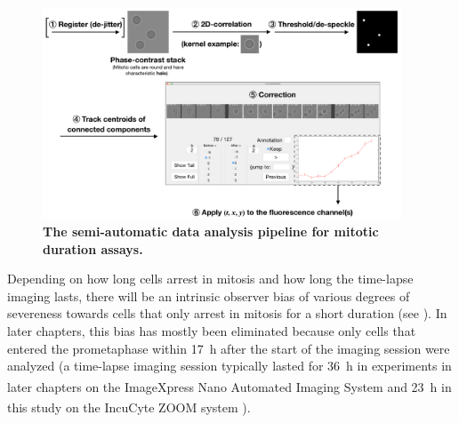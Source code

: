 \begin{figure}
    \centering
    \includegraphics[width=0.95\textwidth]{chapters/figures/DataAnalysisPipeline.pdf}
    \caption{\textbf{The semi-automatic data analysis pipeline for mitotic duration assays.}}
    \label{DataAnalysisPipeline}
\end{figure}

Depending on how long cells arrest in mitosis and how long the time-lapse imaging lasts, there will be an intrinsic observer bias of various degrees of severeness towards cells that only arrest in mitosis for a short duration (see ). In later chapters, this bias has mostly been eliminated because only cells that entered the prometaphase within \SI{17}{h} after the start of the imaging session were analyzed (a time-lapse imaging session typically lasted for \SI{36}{h} in experiments in later chapters on the ImageXpress\textsuperscript{\textregistered} Nano Automated Imaging System and \SI{23}{h} in this study on the IncuCyte\textsuperscript{\textregistered} ZOOM system \cite{eSAC}).

